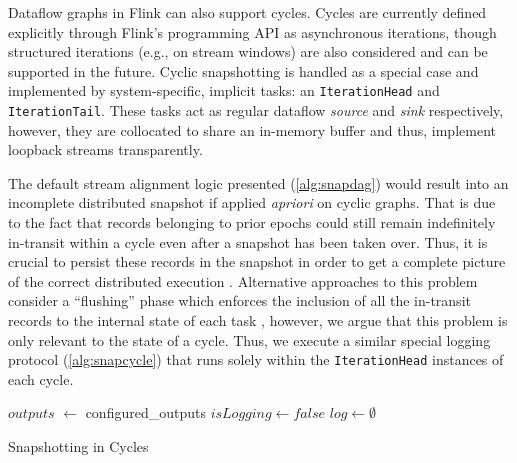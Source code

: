 Dataflow graphs in Flink can also support cycles. Cycles are currently defined explicitly through Flink's programming API as asynchronous iterations, though structured iterations (e.g., on stream windows) are also considered and can be supported in the future. Cyclic snapshotting is handled as a special case and implemented by system-specific, implicit tasks: an \texttt{IterationHead} and \texttt{IterationTail}. These tasks act as regular dataflow \emph{source} and \emph{sink} respectively, however, they are collocated to share an in-memory buffer and thus, implement loopback streams transparently.

The default stream alignment logic presented (\autoref{alg:snapdag}) would result into an incomplete distributed snapshot if applied \emph{apriori} on cyclic graphs. That is due to the fact that records belonging to prior epochs could still remain indefinitely in-transit within a cycle even after a snapshot has been taken over. Thus, it is crucial to persist these records in the snapshot in order to get a complete picture of the correct distributed execution \cite{chandy1985distributed,elnozahy2002survey}. Alternative approaches to this problem consider a ``flushing'' phase which enforces the inclusion of all the in-transit records to the internal state of each task \cite{jacques2016consistent}, however, we argue that this problem is only relevant to the state of a cycle. Thus, we execute a similar special logging protocol (\ref{alg:snapcycle}) that runs solely within the \texttt{IterationHead} instances of each cycle.

\begin{algorithm}[t]
$outputs$ $\leftarrow$ configured\_outputs\;
$isLogging \leftarrow false$ \;
$log \leftarrow \emptyset$ \;

\caption{Snapshotting in Cycles}
\label{alg:snapcycle}
\end{algorithm}



